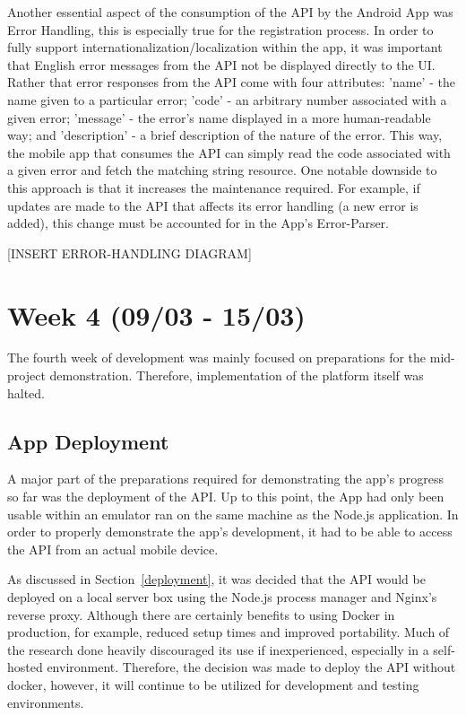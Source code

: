 Another essential aspect of the consumption of the API by the Android App was Error Handling, this is especially true for the registration process. In order to fully support internationalization/localization within the app, it was important that English error messages from the API not be displayed directly to the UI. Rather that error responses from the API come with four attributes: 'name' - the name given to a particular error; 'code' - an arbitrary number associated with a given error; 'message' - the error's name displayed in a more human-readable way; and 'description' - a brief description of the nature of the error. This way, the mobile app that consumes the API can simply read the code associated with a given error and fetch the matching string resource. One notable downside to this approach is that it increases the maintenance required. For example, if updates are made to the API that affects its error handling (a new error is added), this change must be accounted for in the App's Error-Parser.

[INSERT ERROR-HANDLING DIAGRAM]

\section{Week 4 (09/03 - 15/03)}
The fourth week of development was mainly focused on preparations for the mid-project demonstration. Therefore, implementation of the platform itself was halted.

\subsection{App Deployment}
A major part of the preparations required for demonstrating the app's progress so far was the deployment of the API. Up to this point, the App had only been usable within an emulator ran on the same machine as the Node.js application. In order to properly demonstrate the app's development, it had to be able to access the API from an actual mobile device.

As discussed in Section~\ref{deployment}, it was decided that the API would be deployed on a local server box using the Node.js process manager and Nginx's reverse proxy. Although there are certainly benefits to using Docker in production, for example, reduced setup times and improved portability. Much of the research done heavily discouraged its use if inexperienced, especially in a self-hosted environment. Therefore, the decision was made to deploy the API without docker, however, it will continue to be utilized for development and testing environments.

